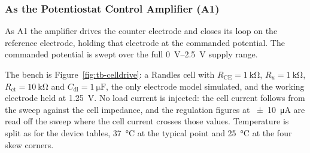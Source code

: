 %
%
%

\subsubsection{As the Potentiostat Control Amplifier (A1)}\label{sss:ampab-ctrl}

As A1 the amplifier drives the counter electrode and closes its loop on the reference
electrode, holding that electrode at the commanded potential. The commanded potential is
swept over the full \SIrange{0}{2.5}{\volt} supply range.

The bench is Figure~\ref{fig:tb-celldrive}: a Randles cell with
$R_{\mathrm{CE}} = \SI{1}{\kilo\ohm}$, $R_u = \SI{1}{\kilo\ohm}$,
$R_{\mathrm{ct}} = \SI{10}{\kilo\ohm}$ and $C_{\mathrm{dl}} = \SI{1}{\micro\farad}$,
the only electrode model simulated, and the working electrode held at
\SI{1.25}{\volt}. No load current is injected: the cell current follows from the sweep
against the cell impedance, and the regulation figures at \SI{\pm 10}{\micro\ampere} are
read off the sweep where the cell current crosses those values. Temperature is split as
for the device tables, \SI{37}{\celsius} at the typical point and \SI{25}{\celsius} at
the four skew corners.
